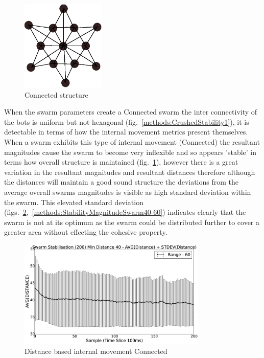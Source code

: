 \documentclass[10pt,journal,letterpaper,twoside]{IEEEtran}
\newcommand{\swarmB}{Connected}
\newcommand{\stability}{internal movement}
\newcommand{\Fig}{fig.}
\newcommand{\Figs}{figs.}
\begin{document}
\begin{figure}[H]
\begin{center}
\includegraphics[width=4cm]{figures/StableFormsCompressed}
\end{center}
\caption{\swarmB{} structure} \label{methods:StableSwarmCompressed}
\end{figure}

When the swarm parameters create a \swarmB{} swarm the inter
connectivity of the bots is uniform but not hexagonal
(\Fig{}~\ref{methods:CrushedStability1}), it is detectable in terms of
how the \stability{} metrics present themselves. When a swarm exhibits
this type of \stability{} (\swarmB{}) the resultant magnitudes cause
the swarm to become very inflexible and so appears 'stable' in terms
how overall structure is maintained
(\Fig{}~\ref{methods:StableSwarmCompressed}), however there is a great
variation in the resultant magnitudes and resultant distances
therefore although the distances will maintain a good sound structure
the deviations from the average overall swarms magnitudes is visible
as high standard deviation within the swarm.  This elevated standard
deviation
(\Figs{}~\ref{methods:StabilityDistanceSwarm40-60},~\ref{methods:StabilityMagnitudeSwarm40-60})
indicates clearly that the swarm is not at its optimum as the swarm
could be distributed further to cover a greater area without effecting
the cohesive property.

\begin{figure}[H]
\begin{center}
\includegraphics[width=9cm]{figures/StabilityDistanceSwarm40-60}
\end{center}
\caption{Distance based \stability{} \swarmB{}\label{methods:StabilityDistanceSwarm40-60}}
\end{figure}
\end{document}
